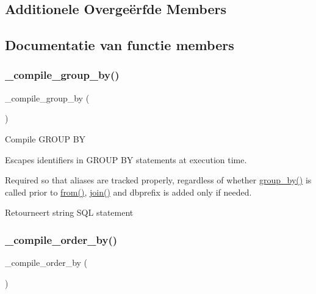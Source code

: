\subsection*{Additionele Overge\"{e}rfde Members}


\subsection{Documentatie van functie members}
\mbox{\label{class_c_i___d_b__query__builder_a953e760f382d7187dc5d7b238a7ff439}} 
\subsubsection{\texorpdfstring{\_compile\_group\_by()}{\_compile\_group\_by()}}
{\footnotesize\ttfamily \+\_\+compile\+\_\+group\+\_\+by (\begin{DoxyParamCaption}{ }\end{DoxyParamCaption})\hspace{0.3cm}{\ttfamily [protected]}}

Compile G\+R\+O\+UP BY

Escapes identifiers in G\+R\+O\+UP BY statements at execution time.

Required so that aliases are tracked properly, regardless of whether \mbox{\hyperlink{class_c_i___d_b__query__builder_a111cc822f85357c4cfe37886e6315dce}{group\+\_\+by()}} is called prior to \mbox{\hyperlink{class_c_i___d_b__query__builder_a91f5f004ed8e2237a4decc5d23ac3457}{from()}}, \mbox{\hyperlink{class_c_i___d_b__query__builder_a54557b1ef757507cbbd2a8802a99810b}{join()}} and dbprefix is added only if needed.

\begin{DoxyReturn}{Retourneert}
string S\+QL statement 
\end{DoxyReturn}
\mbox{\label{class_c_i___d_b__query__builder_a78ef026e2ca49e2b371f9cc577f6e777}} 
\subsubsection{\texorpdfstring{\_compile\_order\_by()}{\_compile\_order\_by()}}
{\footnotesize\ttfamily \+\_\+compile\+\_\+order\+\_\+by (\begin{DoxyParamCaption}{ }\end{DoxyParamCaption})\hspace{0.3cm}{\ttfamily [protected]}}

